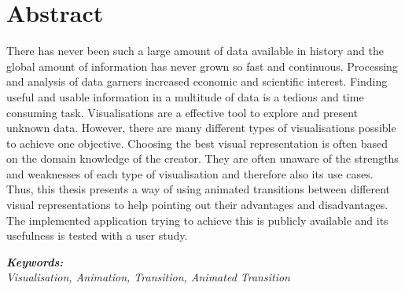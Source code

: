 \section*{Abstract}
\vspace{0.5cm}

There has never been such a large amount of data available in history and the global amount of information has never grown so fast and continuous. Processing and analysis of data garners increased economic and scientific interest. Finding useful and usable information in a multitude of data is a tedious and time consuming task. Visualisations are a effective tool to explore and present unknown data. However, there are many different types of visualisations possible to achieve one objective. Choosing the best visual representation is often based on the domain knowledge of the creator. They are often unaware of the strengths and weaknesses of each type of visualisation and therefore also its use cases. Thus, this thesis presents a way of using animated transitions between different visual representations to help pointing out their advantages and disadvantages. The implemented application trying to achieve this is publicly available and its usefulness is tested with a user study.

\vspace{0.5cm}
\textbf{\textit{Keywords:}} \\
\textit{Visualisation, Animation, Transition, Animated Transition}